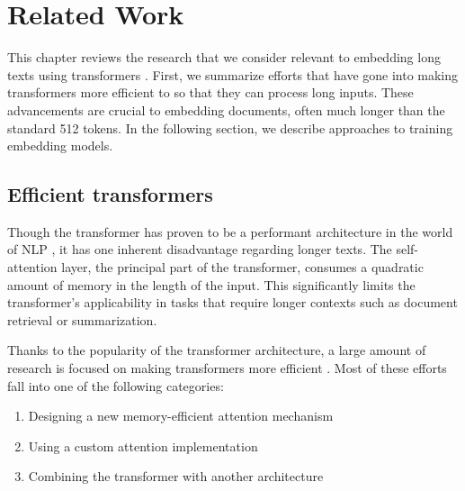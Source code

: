 \chapter{Related Work}\label{chapter:related_work}

This chapter reviews the research that we consider relevant to embedding
long texts using transformers \citep{vaswani2017attention}. First, we summarize
efforts that have gone into making transformers more efficient to so that they
can process long inputs. These advancements are crucial to embedding documents,
often much longer than the standard 512 tokens. In the following section, we
describe approaches to training embedding models.

\section{Efficient transformers}\label{section:efficient_transformers}


Though the transformer has proven to be a performant architecture in the world
of NLP \citep{devlin2019bert, liu2019roberta, reimers2019sentence}, it has one
inherent disadvantage regarding longer texts. The self-attention layer, the
principal part of the transformer, consumes a quadratic amount of memory in the
length of the input. This significantly limits the transformer's applicability
in tasks that require longer contexts such as document retrieval or
summarization.

Thanks to the popularity of the transformer architecture, a large
amount of research is focused on making transformers more
efficient \citep{tay2022efficient}. Most of these efforts fall into one of the
following categories:

\begin{enumerate}

    \item Designing a new memory-efficient attention mechanism

    \item Using a custom attention implementation

    \item Combining the transformer with another architecture

\end{enumerate}

